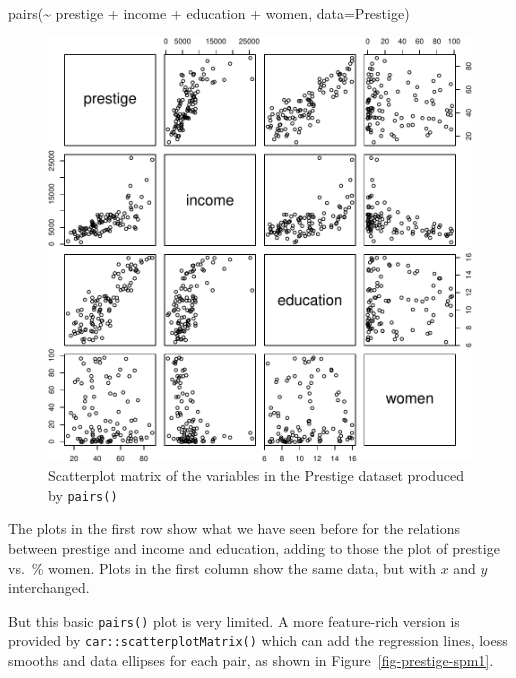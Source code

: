 \documentclass[
  letterpaper,
  10pt,
  krantz2]{krantz}
\makeatletter
\newenvironment{Shaded}{\begin{snugshade}}{\end{snugshade}}
\newcommand{\AttributeTok}[1]{\textcolor[rgb]{0.40,0.45,0.13}{#1}}
\newcommand{\FunctionTok}[1]{\textcolor[rgb]{0.28,0.35,0.67}{#1}}
\newcommand{\NormalTok}[1]{\textcolor[rgb]{0.00,0.23,0.31}{#1}}
\newcommand{\SpecialCharTok}[1]{\textcolor[rgb]{0.37,0.37,0.37}{#1}}
\newenvironment{kframe}{%
  \medskip{}
  \setlength{\fboxsep}{.8em}
  \def\at@end@of@kframe{}%
  \ifinner\ifhmode%
  \def\at@end@of@kframe{\end{minipage}}%
  \begin{minipage}{\columnwidth}%
  \fi\fi%
  \def\FrameCommand##1{\hskip\@totalleftmargin \hskip-\fboxsep
  \colorbox{shadecolor}{##1}\hskip-\fboxsep
      \hskip-\linewidth \hskip-\@totalleftmargin \hskip\columnwidth}%
  \MakeFramed {\advance\hsize-\width
    \@totalleftmargin\z@ \linewidth\hsize
    \@setminipage}}%
{\par\unskip\endMakeFramed%
  \at@end@of@kframe}
\renewenvironment{Shaded}{\begin{kframe}}{\end{kframe}}
\makeatother
\begin{document}
\begin{Shaded}
\begin{Highlighting}[]
\FunctionTok{pairs}\NormalTok{(}\SpecialCharTok{\textasciitilde{}}\NormalTok{ prestige }\SpecialCharTok{+}\NormalTok{ income }\SpecialCharTok{+}\NormalTok{ education }\SpecialCharTok{+}\NormalTok{ women,}
      \AttributeTok{data=}\NormalTok{Prestige)}
\end{Highlighting}
\end{Shaded}

\begin{figure}[H]

{\centering \includegraphics[width=1\textwidth,height=\textheight]{figs/ch03/fig-prestige-pairs-1.pdf}

}

\caption{\label{fig-prestige-pairs}Scatterplot matrix of the variables
in the Prestige dataset produced by \texttt{pairs()}}

\end{figure}

The plots in the first row show what we have seen before for the
relations between prestige and income and education, adding to those the
plot of prestige vs.~\% women. Plots in the first column show the same
data, but with \(x\) and \(y\) interchanged.

But this basic \texttt{pairs()} plot is very limited. A more
feature-rich version is provided by \texttt{car::scatterplotMatrix()}
which can add the regression lines, loess smooths and data ellipses for
each pair, as shown in Figure~\ref{fig-prestige-spm1}.
\end{document}
